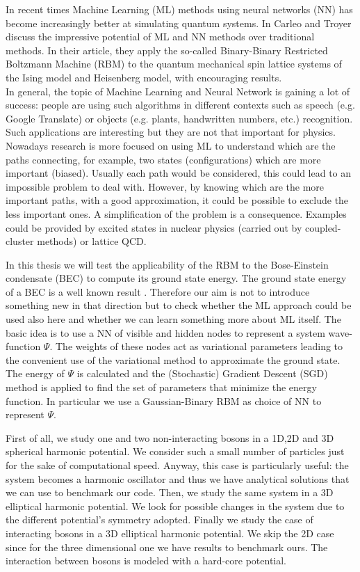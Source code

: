 In recent times Machine Learning (ML) methods using neural networks (NN) has become increasingly better at simulating quantum systems. In \cite{carleoSolvingQuantumManybody2017} Carleo and Troyer discuss the impressive potential of ML and NN methods over traditional methods.  In their article, they apply the so-called Binary-Binary Restricted Boltzmann Machine (RBM) to the quantum mechanical spin lattice systems of the Ising model and Heisenberg model, with
encouraging results. \\
In general, the topic of Machine Learning and Neural Network is gaining a lot of success: people are using such algorithms in different contexts such as speech (e.g. Google Translate) or objects (e.g. plants, handwritten numbers, etc.) recognition. Such applications are interesting but they are not that important for physics. Nowadays research is more focused on using ML to understand which are the paths connecting, for example, two states (configurations) which are more important (biased). Usually each path would be considered, this could lead to an impossible problem to deal with. However, by knowing which are the more important paths, with a good approximation, it could be possible to exclude the less important ones. A simplification of the problem is a consequence. Examples could be provided by excited states in nuclear physics (carried out by coupled-cluster methods) or lattice QCD.

In this thesis we will test the applicability of the RBM to the Bose-Einstein condensate (BEC) to compute its ground state energy. The ground state energy of a BEC is a well known result \cite{DalfString}. Therefore our aim is not to introduce something new in that direction but to check whether the ML approach could be used also here and whether we can learn something more about ML itself. The basic idea is to use a NN of visible and hidden nodes to represent a system wave-function $\Psi$. The weights of these nodes act as variational parameters leading to the convenient use of the variational method to approximate the ground state. The energy of $\Psi$ is calculated and the (Stochastic) Gradient Descent (SGD) method is applied to find the set of parameters that minimize the energy function. In particular we use a Gaussian-Binary RBM as choice of NN to represent $\Psi$.

First of all, we study one and two non-interacting bosons in a 1D,2D and 3D spherical harmonic potential. We consider such a small number of particles just for the sake of computational speed. Anyway, this case is particularly useful: the system becomes a harmonic oscillator and thus we have analytical solutions that we can use to benchmark our code. Then, we study the same system in a 3D elliptical harmonic potential. We look for possible changes in the system due to the different potential's symmetry adopted. Finally we study the case of interacting bosons in a 3D elliptical harmonic potential. We skip the 2D case since for the three dimensional one we have results to benchmark ours. The interaction between bosons is modeled with a hard-core potential.

